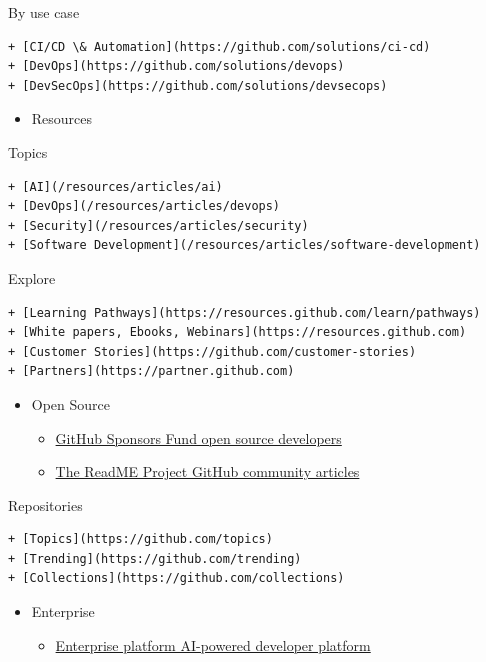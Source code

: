 \documentclass[
  letterpaper,
]{book}
\providecommand{\tightlist}{%
  \setlength{\itemsep}{0pt}\setlength{\parskip}{0pt}}\usepackage{longtable,booktabs,array}
\begin{document}
By use case

\begin{verbatim}
+ [CI/CD \& Automation](https://github.com/solutions/ci-cd)
+ [DevOps](https://github.com/solutions/devops)
+ [DevSecOps](https://github.com/solutions/devsecops)
\end{verbatim}

\begin{itemize}
\tightlist
\item
  Resources
\end{itemize}

Topics

\begin{verbatim}
+ [AI](/resources/articles/ai)
+ [DevOps](/resources/articles/devops)
+ [Security](/resources/articles/security)
+ [Software Development](/resources/articles/software-development)
\end{verbatim}

Explore

\begin{verbatim}
+ [Learning Pathways](https://resources.github.com/learn/pathways)
+ [White papers, Ebooks, Webinars](https://resources.github.com)
+ [Customer Stories](https://github.com/customer-stories)
+ [Partners](https://partner.github.com)
\end{verbatim}

\begin{itemize}
\item
  Open Source

  \begin{itemize}
  \item
    \href{./sponsors}{GitHub Sponsors Fund open source developers}
  \item
    \href{https://github.com/readme}{The ReadME Project GitHub community
    articles}
  \end{itemize}
\end{itemize}

Repositories

\begin{verbatim}
+ [Topics](https://github.com/topics)
+ [Trending](https://github.com/trending)
+ [Collections](https://github.com/collections)
\end{verbatim}

\begin{itemize}
\item
  Enterprise

  \begin{itemize}
  \tightlist
  \item
    \href{./enterprise}{Enterprise platform AI-powered developer
    platform}
  \end{itemize}
\end{itemize}
\end{document}
